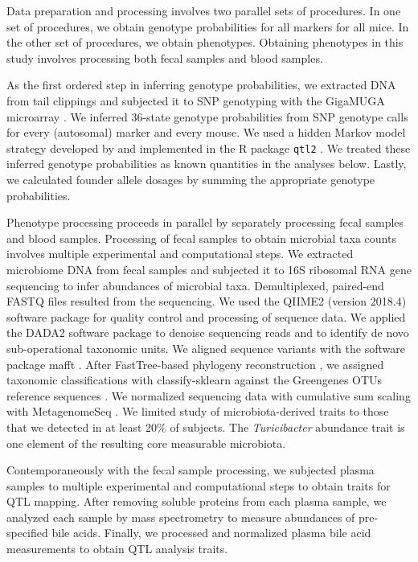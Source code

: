 \documentclass[oneside]{book}\usepackage[]{graphicx}\usepackage[]{color}
\begin{document}
Data preparation and processing involves two parallel sets of procedures. In one set of procedures, we obtain genotype probabilities for all markers for all mice. In the other set of procedures, we obtain phenotypes. Obtaining phenotypes in this study involves processing both fecal samples and blood samples. 

As the first ordered step in inferring genotype probabilities, we extracted DNA from tail clippings and subjected it to SNP genotyping with the GigaMUGA microarray \citep{morgan2015mouse}. 
We inferred 36-state genotype probabilities from SNP genotype calls for every (autosomal) 
marker and every mouse. 
We used a hidden Markov model strategy developed by 
\citet{broman2012genotype, broman2012haplotype} and implemented in 
the R package \texttt{qtl2} \citep{broman2019rqtl2}. 
We treated these inferred 
genotype probabilities as known quantities in the analyses below. 
Lastly, we calculated founder allele dosages by summing the appropriate 
genotype probabilities. 




Phenotype processing proceeds in parallel by separately processing fecal samples and blood samples. Processing of fecal samples to obtain microbial taxa counts 
involves multiple experimental and computational steps. 
We extracted microbiome DNA from fecal 
samples and subjected it to 16S ribosomal RNA gene sequencing to infer 
abundances of microbial taxa. 
Demultiplexed, 
paired-end FASTQ files resulted from the sequencing. 
We used the 
QIIME2 (version 2018.4) software package \citep{bolyen2018qiime} for quality control and 
processing of sequence data. 
We applied the DADA2 software package \citep{callahan2016dada2} to denoise sequencing reads and to identify de novo sub-operational 
taxonomic units. We aligned sequence variants with the software 
package mafft \citep{katoh2013mafft}. 
After FastTree-based phylogeny reconstruction \citep{price2010fasttree}, we 
assigned taxonomic classifications with classify-sklearn against the 
Greengenes OTUs reference sequences \citep{desantis2006greengenes}. 
We normalized sequencing data 
with cumulative sum scaling with MetagenomeSeq \citep{paulson2013metagenomeseq}. 
We limited study of 
microbiota-derived traits to those that we detected in at least 20\% 
of subjects. 
The \emph{Turicibacter} abundance trait is one element 
of the resulting core measurable microbiota. 


Contemporaneously with the fecal sample processing, we subjected plasma samples to multiple experimental and computational steps to obtain traits for QTL mapping. 
After removing soluble 
proteins from each plasma sample, we analyzed each sample by mass spectrometry to 
measure abundances 
of pre-specified bile acids. 
Finally, we processed and normalized plasma bile 
acid measurements to obtain QTL analysis traits.
\end{document}
